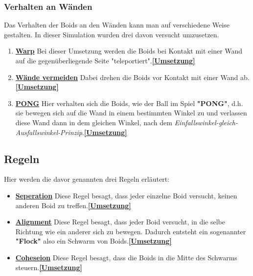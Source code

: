\documentclass[a4paper, hidelinks, 12pt]{article}
\begin{document}
\subsubsection{Verhalten an Wänden}\label{IdeeVerhalten}
Das Verhalten der Boids an den Wänden kann man auf verschiedene Weise gestalten. In dieser Simulation wurden drei davon versucht umzusetzen. 
\begin{enumerate}
\item \underline{\textbf{Warp}}\linebreak\label{IdeeWarp}
Bei dieser Umsetzung werden die Boids bei Kontakt mit einer Wand auf die gegenüberliegende Seite "teleportiert".\scriptsize\hyperref[Umsetzungmove]{\textbf{[Umsetzung]}}\normalsize		
			
\item \underline{\textbf{Wände vermeiden}}\linebreak\label{IdeeAvoidWall}
Dabei drehen die Boids vor Kontakt mit einer Wand ab.\scriptsize\hyperref[UmsetzungavoidWall]{\textbf{[Umsetzung]}}\normalsize		
	
\item \underline{\textbf{PONG}}\linebreak\label{IdeePong}
Hier verhalten sich die Boids, wie der Ball im Spiel \textbf{"PONG"}\cite{andysarcade2022}, d.h. sie bewegen sich auf die Wand in einem bestimmten Winkel zu und verlassen diese Wand dann in dem gleichen Winkel, nach dem \emph{Einfallswinkel-gleich-Ausfallswinkel-Prinzip}.\scriptsize\hyperref[Umsetzungmove]{\textbf{[Umsetzung]}}\normalsize		
\end{enumerate}

\subsection{Regeln}\label{IdeeRegel}
Hier werden die davor genannten drei Regeln erläutert\cite{Lague2022}:
\begin{itemize}
\item\textbf{\underline{Seperation}}\linebreak\label{IdeeSeperation}
Diese Regel besagt, dass jeder einzelne Boid versucht, keinen anderen Boid zu treffen.\scriptsize\hyperref[seperationCohesion]{\textbf{[Umsetzung]}}\normalsize
\item\textbf{\underline{Alignment}}\linebreak\label{IdeeAlignment}
Diese Regel besagt, dass jeder Boid versucht, in die selbe Richtung wie ein anderer sich zu bewegen. Dadurch entsteht ein sogenannter \textbf{"Flock"} also ein Schwarm von Boids.\scriptsize\hyperref[Umsetzungalignment]{\textbf{[Umsetzung]}}\normalsize
\item\textbf{\underline{Coheseion}}\linebreak\label{IdeeCohesion}
Diese Regel besagt, dass die Boids in die Mitte des Schwarms steuern.\scriptsize\hyperref[seperationCohesion]{\textbf{[Umsetzung]}}\normalsize
\end{itemize}
	
\end{document}
